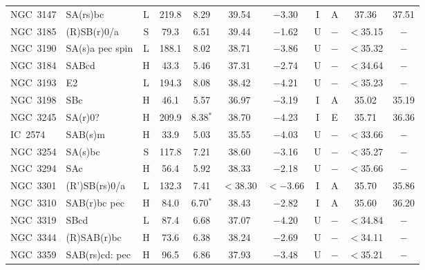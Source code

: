 \begin{center}
\begin{longtable}{lC{2.5cm}ccccccccc}
NGC~3147 & SA(rs)bc       & L               & 219.8 & 8.29             & 39.54    & $-$3.30   &    I   & A        & 37.36    & 37.51    \\
NGC~3185 & (R)SB(r)0/a    & S               & 79.3  & 6.51             & 39.44    & $-$1.62   &    U   &$-$       & $<$35.15    & $-$       \\
NGC~3190 & SA(s)a pec spin  & L         & 188.1 & 8.02             & 38.71    & $-$3.86   &        U   &$-$       & $<$35.32 & $-$       \\
NGC~3184  & SABcd        & H              & 43.3     & 5.46            &  37.31   & $-$2.74    &    U &    $-$      & $<$34.64 & $-$  \\
NGC~3193 & E2               & L               & 194.3 & 8.08             & 38.42    & $-$4.21   &  U   &$-$       & $<$35.23 & $-$       \\
NGC~3198  & SBc            &  H            &  46.1    &  5.57            & 36.97    & $-$3.19  &   I     & A         &  35.02    &  35.19  \\
NGC~3245 & SA(r)0?         & H          & 209.9 & 8.38$^{*}$      & 38.70    & $-$4.23   &         I   & E        & 35.71    & 36.36  \\
IC~2574    & SAB(s)m       & H               & 33.9  & 5.03             & 35.55    & $-$4.03    & U   &$-$       & $<$33.66 & $-$       \\
NGC~3254 & SA(s)bc         & S               & 117.8 & 7.21             & 38.60    & $-$3.16   &     U   & $-$       & $<$35.27 & $-$       \\
NGC~3294  & SAc           &  H                &   56.4  &  5.92         &  38.33     &  $-$2.18   &   U  &   $-$      & $<$35.66 & $-$  \\
NGC~3301 & (R')SB(rs)0/a    & L         & 132.3 & 7.41             & $<$38.30 & $<-$3.66  &        I   & A        & 35.70    & 35.86    \\
NGC~3310 & SAB(r)bc pec   & H               & 84.0   & 6.70$^{*}$       & 38.43    & $-$2.82  &     I   & A        & 35.60    & 36.20       \\
NGC~3319  & SBcd           &   L             &  87.4    &  6.68        &   37.07   &  $-$4.20     &     U &   $-$      & $<$34.84 & $-$  \\
NGC~3344 & (R)SAB(r)bc     & H               & 73.6  & 6.38             & 38.24    & $-$2.69   &     U   &$-$       & $<$34.11 & $-$       \\
NGC~3359 & SAB(rs)cd: pec  & H               & 96.5  & 6.86             & 37.93   & $-$3.48    &    U   &$-$       &  $<$35.21 & $-$      \\

\end{longtable}
\end{center}
